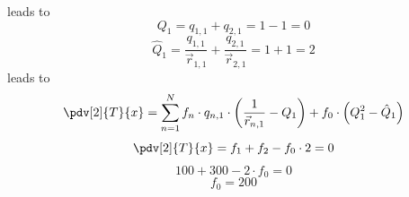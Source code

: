 leads to
\begin{equation}
	Q_1 = q_{1, 1} + q_{2, 1} = 1 - 1 = 0
\end{equation}
\begin{equation}
	\hat{Q}_1 = \frac{q_{1, 1}}{\vec{r}_{1, 1}} + \frac{q_{2, 1}}{\vec{r}_{2, 1}} = 1 + 1 = 2
\end{equation}
leads to
\begin{equation}
	\pdv[2]{T}{x} = \sum_{n = 1}^N f_n \cdot q_{n, 1} \cdot \left( \frac{1}{\vec{r}_{n, 1}} - Q_1 \right) + f_0 \cdot \left( Q_1^2 - \hat{Q}_1 \right)
\end{equation}
\begin{equation}
	\pdv[2]{T}{x} = f_1  +  f_2  - f_0 \cdot 2 = 0
\end{equation}
\begin{equation}
	100  +  300  - 2 \cdot f_0 = 0
\end{equation}
\begin{equation}
	f_0 = 200
\end{equation}

